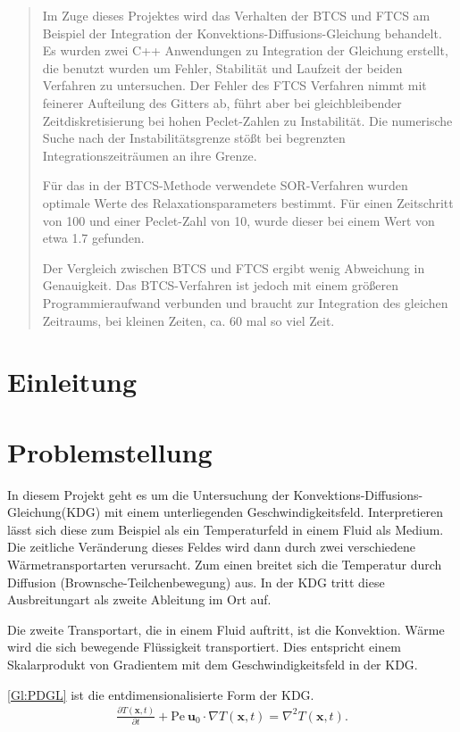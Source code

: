 \begin{abstract}
Im Zuge dieses Projektes wird das Verhalten der BTCS und FTCS am Beispiel der Integration der Konvektions-Diffusions-Gleichung behandelt. Es wurden zwei C++ Anwendungen zu Integration der Gleichung erstellt, die benutzt wurden um Fehler, Stabilität und Laufzeit der beiden Verfahren zu untersuchen. Der Fehler des FTCS Verfahren nimmt mit feinerer Aufteilung des Gitters ab, führt aber bei gleichbleibender Zeitdiskretisierung bei hohen Peclet-Zahlen zu Instabilität. Die numerische Suche nach der Instabilitätsgrenze stößt bei begrenzten Integrationszeiträumen an ihre Grenze.

Für das in der BTCS-Methode verwendete SOR-Verfahren wurden optimale Werte des Relaxationsparameters bestimmt. Für einen Zeitschritt von 100 und einer Peclet-Zahl von 10, wurde dieser bei einem Wert von etwa 1.7 gefunden.

Der Vergleich zwischen BTCS und FTCS ergibt wenig Abweichung in Genauigkeit. Das BTCS-Verfahren ist jedoch mit einem größeren Programmieraufwand verbunden und braucht zur Integration des gleichen Zeitraums, bei kleinen Zeiten, ca. 60 mal so viel Zeit.
\end{abstract}

\section{Einleitung}

\section{Problemstellung}
In diesem Projekt geht es um die Untersuchung der Konvektions-Diffusions-Gleichung(KDG) mit einem unterliegenden Geschwindigkeitsfeld.
Interpretieren lässt sich diese zum Beispiel als ein Temperaturfeld in einem Fluid als Medium.
Die zeitliche Veränderung dieses Feldes wird dann durch zwei verschiedene Wärmetransportarten verursacht.
Zum einen breitet sich die Temperatur durch Diffusion (Brownsche-Teilchenbewegung) aus. In der KDG tritt diese Ausbreitungart als zweite Ableitung im Ort auf.

Die zweite Transportart, die in einem Fluid auftritt, ist die Konvektion. Wärme wird die sich bewegende Flüssigkeit transportiert. Dies entspricht einem Skalarprodukt von Gradientem mit dem Geschwindigkeitsfeld in der KDG.

\cref{Gl:PDGL} ist die entdimensionalisierte Form der KDG.
\begin{align}
  \frac{\partial T(\boldsymbol x, t)}{\partial t} + \text{Pe}~ \boldsymbol{u}_0\cdot \nabla T(\boldsymbol x, t) = \nabla^2 T(\boldsymbol x, t). \label{Gl:PDGL}
\end{align}

